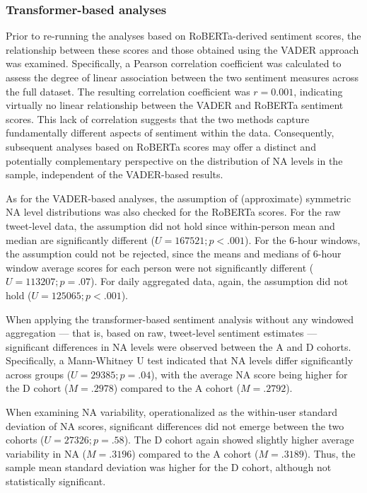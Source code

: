 \subsubsection{Transformer-based analyses}

Prior to re-running the analyses based on RoBERTa-derived sentiment scores, the relationship between these scores and those obtained using the VADER approach was examined. Specifically, a Pearson correlation coefficient was calculated to assess the degree of linear association between the two sentiment measures across the full dataset. The resulting correlation coefficient was $r = 0.001$, indicating virtually no linear relationship between the VADER and RoBERTa sentiment scores. This lack of correlation suggests that the two methods capture fundamentally different aspects of sentiment within the data. Consequently, subsequent analyses based on RoBERTa scores may offer a distinct and potentially complementary perspective on the distribution of NA levels in the sample, independent of the VADER-based results.

As for the VADER-based analyses, the assumption of (approximate) symmetric NA level distributions was also checked for the RoBERTa scores. For the raw tweet-level data, the assumption did not hold since within-person mean and median are significantly different ($U = 167521; p < .001$). For the 6-hour windows, the assumption could not be rejected, since the means and medians of 6-hour window average scores for each person were not significantly different ($U = 113207; p = .07$). For daily aggregated data, again, the assumption did not hold ($U = 125065; p < .001$).

When applying the transformer-based sentiment analysis without any windowed aggregation — that is, based on raw, tweet-level sentiment estimates — significant differences in NA levels were observed between the A and D cohorts. Specifically, a Mann-Whitney U test indicated that NA levels differ significantly across groups ($U = 29385; p = .04$), with the average NA score being higher for the D cohort ($M = .2978$) compared to the A cohort ($M = .2792$). 

When examining NA variability, operationalized as the within-user standard deviation of NA scores, significant differences did not emerge between the two cohorts ($U = 27326; p = .58$). The D cohort again showed slightly higher average variability in NA ($M = .3196$) compared to the A cohort ($M = .3189$). Thus, the sample mean standard deviation was higher for the D cohort, although not statistically significant.

